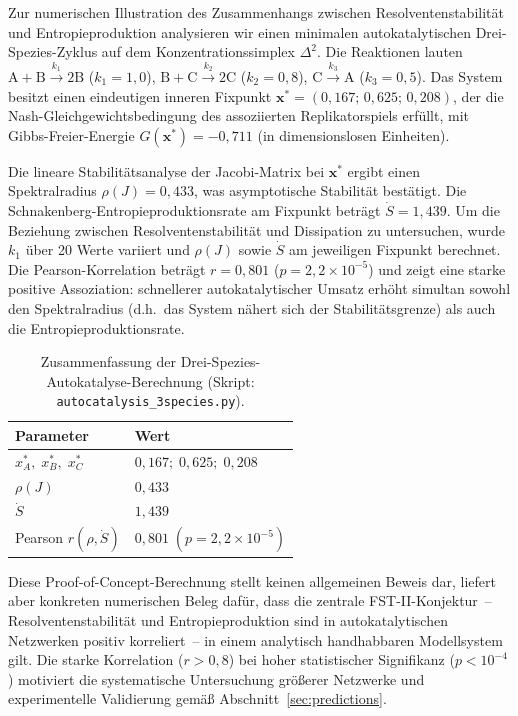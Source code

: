 \documentclass[12pt,a4paper]{article}
\theoremstyle{remark}
\begin{document}
Zur numerischen Illustration des Zusammenhangs zwischen Resolventenstabilit\"at und Entropieproduktion analysieren wir einen minimalen autokatalytischen Drei-Spezies-Zyklus auf dem Konzentrationssimplex $\Delta^2$.
Die Reaktionen lauten $\mathrm{A}+\mathrm{B}\xrightarrow{k_1}2\mathrm{B}$ ($k_1=1{,}0$), $\mathrm{B}+\mathrm{C}\xrightarrow{k_2}2\mathrm{C}$ ($k_2=0{,}8$), $\mathrm{C}\xrightarrow{k_3}\mathrm{A}$ ($k_3=0{,}5$).
Das System besitzt einen eindeutigen inneren Fixpunkt $\mathbf{x}^*=(0{,}167;\,0{,}625;\,0{,}208)$, der die Nash-Gleichgewichtsbedingung des assoziierten Replikatorspiels erf\"ullt, mit Gibbs-Freier-Energie $G(\mathbf{x}^*)=-0{,}711$ (in dimensionslosen Einheiten).

Die lineare Stabilit\"atsanalyse der Jacobi-Matrix bei $\mathbf{x}^*$ ergibt einen Spektralradius $\rho(J)=0{,}433$, was asymptotische Stabilit\"at best\"atigt.
Die Schnakenberg-Entropieproduktionsrate am Fixpunkt betr\"agt $\dot{S}=1{,}439$.
Um die Beziehung zwischen Resolventenstabilit\"at und Dissipation zu untersuchen, wurde $k_1$ \"uber 20 Werte variiert und $\rho(J)$ sowie $\dot{S}$ am jeweiligen Fixpunkt berechnet.
Die Pearson-Korrelation betr\"agt $r=0{,}801$ ($p=2{,}2\times 10^{-5}$) und zeigt eine starke positive Assoziation: schnellerer autokatalytischer Umsatz erh\"oht simultan sowohl den Spektralradius (d.h.\ das System n\"ahert sich der Stabilit\"atsgrenze) als auch die Entropieproduktionsrate.

\begin{table}[htbp]
\centering
\caption{Zusammenfassung der Drei-Spezies-Autokatalyse-Berechnung (Skript: \texttt{autocatalysis\_3species.py}).}
\label{tab:3species}
\small
\begin{tabular}{ll}
\toprule
\textbf{Parameter} & \textbf{Wert} \\
\midrule
$x^*_A,\; x^*_B,\; x^*_C$ & $0{,}167;\; 0{,}625;\; 0{,}208$ \\
$\rho(J)$ & $0{,}433$ \\
$\dot{S}$ & $1{,}439$ \\
Pearson $r(\rho,\dot{S})$ & $0{,}801\;(p = 2{,}2\times10^{-5})$ \\
\bottomrule
\end{tabular}
\end{table}

Diese Proof-of-Concept-Berechnung stellt keinen allgemeinen Beweis dar, liefert aber konkreten numerischen Beleg daf\"ur, dass die zentrale FST-II-Konjektur~-- Resolventenstabilit\"at und Entropieproduktion sind in autokatalytischen Netzwerken positiv korreliert~-- in einem analytisch handhabbaren Modellsystem gilt.
Die starke Korrelation ($r>0{,}8$) bei hoher statistischer Signifikanz ($p<10^{-4}$) motiviert die systematische Untersuchung gr\"o\ss{}erer Netzwerke und experimentelle Validierung gem\"a\ss{} Abschnitt~\ref{sec:predictions}.
\end{document}
